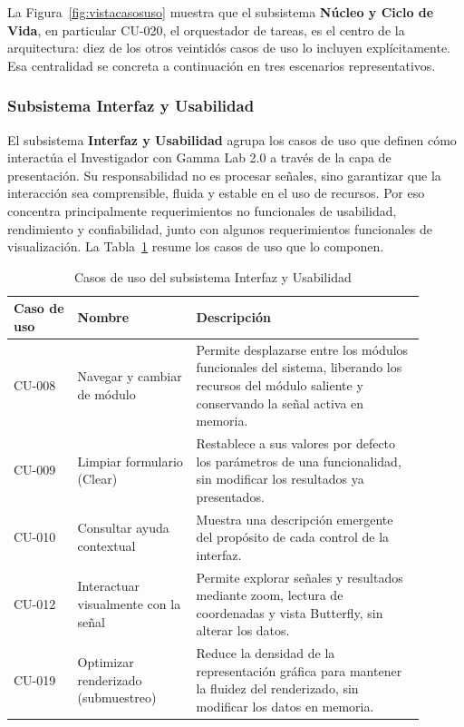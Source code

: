 \documentclass[11pt,a4paper]{article}
\DeclareRobustCommand{\_}{\textunderscore\allowbreak}
\begin{document}
La Figura~\ref{fig:vistacasosuso} muestra que el subsistema \textbf{N\'ucleo y Ciclo de Vida}, en particular CU-020, el orquestador de tareas, es el centro de la arquitectura: diez de los otros veintid\'os casos de uso lo incluyen expl\'icitamente. Esa centralidad se concreta a continuaci\'on en tres escenarios representativos.


\subsubsection{Subsistema Interfaz y Usabilidad}

El subsistema \textbf{Interfaz y Usabilidad} agrupa los casos de uso que definen c\'omo interact\'ua el Investigador con Gamma Lab 2.0 a trav\'es de la capa de presentaci\'on. Su responsabilidad no es procesar se\~nales, sino garantizar que la interacci\'on sea comprensible, fluida y estable en el uso de recursos. Por eso concentra principalmente requerimientos no funcionales de usabilidad, rendimiento y confiabilidad, junto con algunos requerimientos funcionales de visualizaci\'on. La Tabla~\ref{tab:cu_interfaz} resume los casos de uso que lo componen.

\begin{table}[H]
    \centering
    \caption{Casos de uso del subsistema Interfaz y Usabilidad}
    \label{tab:cu_interfaz}
    \begin{tabular}{|p{0.14\linewidth}|p{0.26\linewidth}|p{0.50\linewidth}|}
        \hline
        \textbf{Caso de uso} & \textbf{Nombre} & \textbf{Descripci\'on} \\
        \hline
        CU-008 & Navegar y cambiar de m\'odulo & Permite desplazarse entre los m\'odulos funcionales del sistema, liberando los recursos del m\'odulo saliente y conservando la se\~nal activa en memoria. \\
        \hline
        CU-009 & Limpiar formulario (Clear) & Restablece a sus valores por defecto los par\'ametros de una funcionalidad, sin modificar los resultados ya presentados. \\
        \hline
        CU-010 & Consultar ayuda contextual & Muestra una descripci\'on emergente del prop\'osito de cada control de la interfaz. \\
        \hline
        CU-012 & Interactuar visualmente con la se\~nal & Permite explorar se\~nales y resultados mediante zoom, lectura de coordenadas y vista Butterfly, sin alterar los datos. \\
        \hline
        CU-019 & Optimizar renderizado (submuestreo) & Reduce la densidad de la representaci\'on gr\'afica para mantener la fluidez del renderizado, sin modificar los datos en memoria. \\
        \hline
    \end{tabular}
\end{table}
\end{document}
